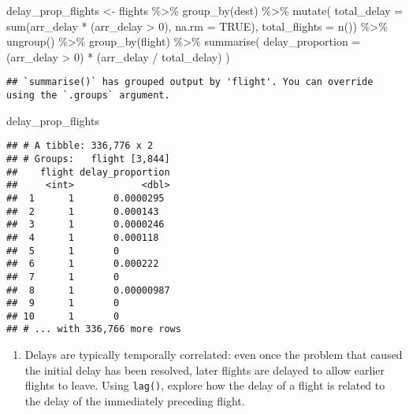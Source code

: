 \documentclass[
]{article}
\newenvironment{Shaded}{\begin{snugshade}}{\end{snugshade}}
\newcommand{\AttributeTok}[1]{\textcolor[rgb]{0.77,0.63,0.00}{#1}}
\newcommand{\ConstantTok}[1]{\textcolor[rgb]{0.00,0.00,0.00}{#1}}
\newcommand{\DecValTok}[1]{\textcolor[rgb]{0.00,0.00,0.81}{#1}}
\newcommand{\FunctionTok}[1]{\textcolor[rgb]{0.00,0.00,0.00}{#1}}
\newcommand{\NormalTok}[1]{#1}
\newcommand{\OtherTok}[1]{\textcolor[rgb]{0.56,0.35,0.01}{#1}}
\newcommand{\SpecialCharTok}[1]{\textcolor[rgb]{0.00,0.00,0.00}{#1}}
\providecommand{\tightlist}{%
  \setlength{\itemsep}{0pt}\setlength{\parskip}{0pt}}
\begin{document}
\begin{Shaded}
\begin{Highlighting}[]
\NormalTok{delay\_prop\_flights }\OtherTok{\textless{}{-}}\NormalTok{ flights }\SpecialCharTok{\%\textgreater{}\%} 
  \FunctionTok{group\_by}\NormalTok{(dest) }\SpecialCharTok{\%\textgreater{}\%} 
  \FunctionTok{mutate}\NormalTok{( }\AttributeTok{total\_delay =} \FunctionTok{sum}\NormalTok{(arr\_delay }\SpecialCharTok{*}\NormalTok{ (arr\_delay }\SpecialCharTok{\textgreater{}} \DecValTok{0}\NormalTok{), }
                              \AttributeTok{na.rm =} \ConstantTok{TRUE}\NormalTok{),}
          \AttributeTok{total\_flights =} \FunctionTok{n}\NormalTok{()) }\SpecialCharTok{\%\textgreater{}\%} 
  \FunctionTok{ungroup}\NormalTok{() }\SpecialCharTok{\%\textgreater{}\%} 
  \FunctionTok{group\_by}\NormalTok{(flight) }\SpecialCharTok{\%\textgreater{}\%} 
  \FunctionTok{summarise}\NormalTok{( }\AttributeTok{delay\_proportion =}\NormalTok{ (arr\_delay }\SpecialCharTok{\textgreater{}} \DecValTok{0}\NormalTok{) }\SpecialCharTok{*}\NormalTok{ (arr\_delay }\SpecialCharTok{/}\NormalTok{ total\_delay) )}
\end{Highlighting}
\end{Shaded}

\begin{verbatim}
## `summarise()` has grouped output by 'flight'. You can override using the `.groups` argument.
\end{verbatim}

\begin{Shaded}
\begin{Highlighting}[]
\NormalTok{delay\_prop\_flights }
\end{Highlighting}
\end{Shaded}

\begin{verbatim}
## # A tibble: 336,776 x 2
## # Groups:   flight [3,844]
##    flight delay_proportion
##     <int>            <dbl>
##  1      1       0.0000295 
##  2      1       0.000143  
##  3      1       0.0000246 
##  4      1       0.000118  
##  5      1       0         
##  6      1       0.000222  
##  7      1       0         
##  8      1       0.00000987
##  9      1       0         
## 10      1       0         
## # ... with 336,766 more rows
\end{verbatim}

\begin{enumerate}
\def\labelenumi{\arabic{enumi}.}
\tightlist
\item
  Delays are typically temporally correlated: even once the problem that
  caused the initial delay has been resolved, later flights are delayed
  to allow earlier flights to leave. Using \texttt{lag()}, explore how
  the delay of a flight is related to the delay of the immediately
  preceding flight.
\end{enumerate}
\end{document}
